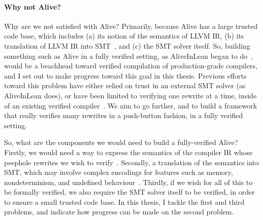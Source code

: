 \paragraph{Why not Alive?}
Why are we not satisfied with Alive? Primarily,
because Alive has a large trusted code base, which includes (a) its notion of the semantics of LLVM IR,
(b) its translation of LLVM IR into SMT~\citep{barrett2010smt,smtlib}, and (c) the SMT solver itself.
So, building something such as Alive in a fully verified setting, as AliveInLean began to do~\citep{lee2019aliveinlean},
would be a beachhead toward verified compilation of production-grade compilers,
and I set out to make progress toward this goal in this thesis.
Previous efforts toward this problem have either relied on trust in an external SMT solver (as AliveInLean does),
or have been limited to verifying one rewrite at a time, inside of an existing verified compiler~\citep{mullen2016verified}.
We aim to go further, and to build a framework that really verifies many rewrites in a push-button fashion, in a fully verified setting.

So, what are the components we would need to build a fully-verified Alive?
Firstly, we would need a way to express the semantics of the compiler IR whose peephole rewrites we wish to verify~\citep{zhao2012formalizing,zakowski2021modular}.
Secondly, a translation of the semantics into SMT, which may involve complex encodings for features such as memory, nondeterminism, and undefined behaviour~\citep{lee2017taming}. Thirdly, if we wish for all of this to be formally verified, we also require the SMT solver itself to be verified,
in order to ensure a small trusted code base.
In this thesis, I tackle the first and third problems, and indicate how progress can be made on the second problem.

